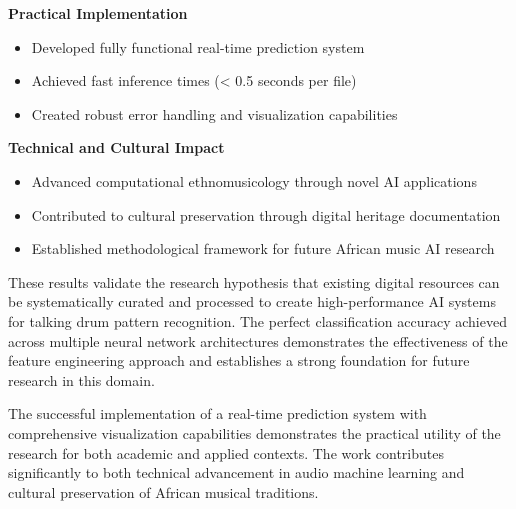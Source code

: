 \documentclass[12pt,a4paper]{article}
\begin{document}
\textbf{Practical Implementation}
\begin{itemize}
\item Developed fully functional real-time prediction system
\item Achieved fast inference times (< 0.5 seconds per file)
\item Created robust error handling and visualization capabilities
\end{itemize}

\textbf{Technical and Cultural Impact}
\begin{itemize}
\item Advanced computational ethnomusicology through novel AI applications
\item Contributed to cultural preservation through digital heritage documentation
\item Established methodological framework for future African music AI research
\end{itemize}

These results validate the research hypothesis that existing digital resources can be systematically curated and processed to create high-performance AI systems for talking drum pattern recognition. The perfect classification accuracy achieved across multiple neural network architectures demonstrates the effectiveness of the feature engineering approach and establishes a strong foundation for future research in this domain.

The successful implementation of a real-time prediction system with comprehensive visualization capabilities demonstrates the practical utility of the research for both academic and applied contexts. The work contributes significantly to both technical advancement in audio machine learning and cultural preservation of African musical traditions.


\end{document}

